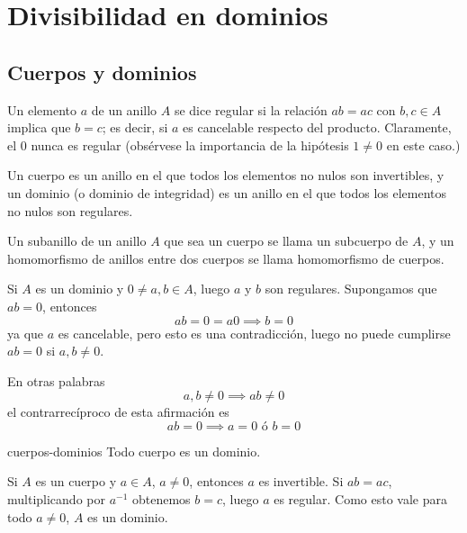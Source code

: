\clearpage

\chapter{Divisibilidad en dominios}

\section{Cuerpos y dominios}

\begin{definition}{}{}
Un elemento \(a\) de un anillo \(A\) se dice regular si la relación \(ab = ac\) con \(b, c \in A\) implica que \(b = c\); es decir, si \(a\) es cancelable respecto del producto. Claramente, el 0 nunca es regular (obsérvese la importancia de la hipótesis \(1 \neq 0\) en este caso.)

Un cuerpo es un anillo en el que todos los elementos no nulos son invertibles, y un dominio (o dominio de integridad) es un anillo en el que todos los elementos no nulos son regulares.

Un subanillo de un anillo \(A\) que sea un cuerpo se llama un subcuerpo de \(A\), y un homomorfismo de anillos entre dos cuerpos se llama homomorfismo de cuerpos.
\end{definition}

\begin{remark}
    Si $A$ es un dominio y $0 \neq a,b \in A$, luego $a$ y $b$ son regulares. Supongamos que $ab = 0$, entonces
    \[
    ab = 0 = a0 \implies b = 0
    \]
    ya que $a$ es cancelable, pero esto es una contradicción, luego no puede cumplirse $ab = 0$ si $a,b \neq 0$.
    
    En otras palabras 
    \[
    a,b \neq 0 \implies ab \neq 0 
    \]
    el contrarrecíproco de esta afirmación es
    \[
    ab = 0 \implies a = 0 \text{ ó } b = 0
    \]
\end{remark}

\begin{proposition}{}{cuerpos-dominios}
Todo cuerpo es un dominio.
\end{proposition}

\begin{proofbox}
Si \(A\) es un cuerpo y \(a \in A\), \(a \neq 0\), entonces \(a\) es invertible. Si \(ab = ac\), multiplicando por \(a^{-1}\) obtenemos \(b = c\), luego \(a\) es regular. Como esto vale para todo \(a \neq 0\), \(A\) es un dominio.
\end{proofbox}

